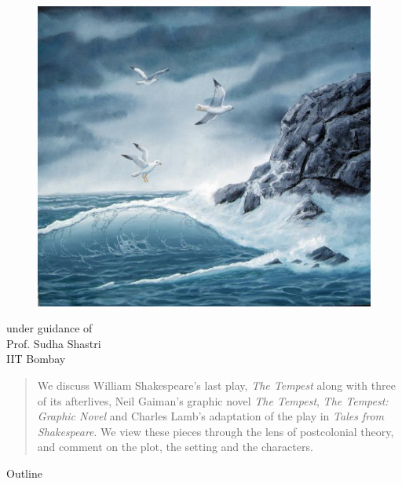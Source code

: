 \documentclass{beamer}
\begin{document}
\begin{frame}[plain]
\titlepage
\begin{center}
\begin{figure}[htp]
  \begin{center}
    \centering
    \includegraphics[scale=0.17]{../Presentation/title.jpg}
  \end{center}
\end{figure}
under guidance of\\
Prof. Sudha Shastri\\
IIT Bombay
\end{center}
\end{frame}
\begin{frame}
\begin{abstract}
  We discuss William Shakespeare's last play, \emph{The Tempest} along with three of its afterlives, Neil Gaiman's graphic novel \emph{The Tempest}, \emph{The Tempest: Graphic Novel} and Charles Lamb's adaptation of the play in \emph{Tales from Shakespeare}. We view these pieces through the lens of postcolonial theory, and comment on the plot, the setting and the characters.
\end{abstract}
\end{frame}
\begin{frame}{Outline}
  \begin{multicols}{2}
  \tableofcontents  
  \end{multicols}
\end{frame}
\end{document}
